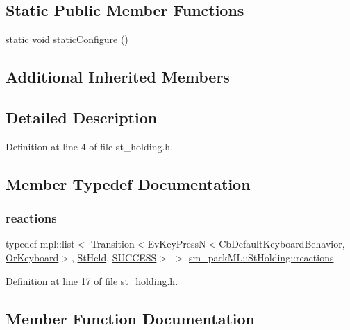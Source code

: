 \subsection*{Static Public Member Functions}
\begin{DoxyCompactItemize}
\item 
static void \hyperlink{structsm__packML_1_1StHolding_a3603a3a25ae5928eb1a39a480426a1b0}{static\+Configure} ()
\end{DoxyCompactItemize}
\subsection*{Additional Inherited Members}


\subsection{Detailed Description}


Definition at line 4 of file st\+\_\+holding.\+h.



\subsection{Member Typedef Documentation}
\mbox{\label{structsm__packML_1_1StHolding_a1189afef659b1cb4e7b5e0b0024ce362}} 
\subsubsection{\texorpdfstring{reactions}{reactions}}
{\footnotesize\ttfamily typedef mpl\+::list$<$ Transition$<$Ev\+Key\+PressN$<$Cb\+Default\+Keyboard\+Behavior, \hyperlink{classsm__packML_1_1OrKeyboard}{Or\+Keyboard}$>$, \hyperlink{structsm__packML_1_1StHeld}{St\+Held}, \hyperlink{classSUCCESS}{S\+U\+C\+C\+E\+SS}$>$ $>$ \hyperlink{structsm__packML_1_1StHolding_a1189afef659b1cb4e7b5e0b0024ce362}{sm\+\_\+pack\+M\+L\+::\+St\+Holding\+::reactions}}



Definition at line 17 of file st\+\_\+holding.\+h.



\subsection{Member Function Documentation}
\mbox{\label{structsm__packML_1_1StHolding_a5534f6aeff3d2f5a0d5db2f0f0cd10f3}} 

